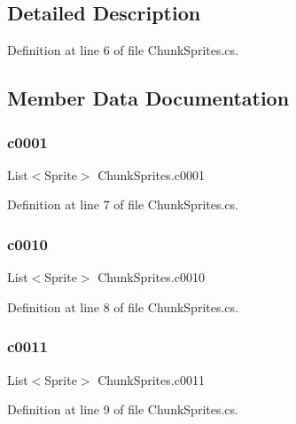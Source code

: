 \subsection{Detailed Description}


Definition at line 6 of file Chunk\+Sprites.\+cs.



\subsection{Member Data Documentation}
\mbox{\label{class_chunk_sprites_a36cf2ce2f744ce381fb5c76df8c4fc50}} 
\subsubsection{\texorpdfstring{c0001}{c0001}}
{\footnotesize\ttfamily List$<$Sprite$>$ Chunk\+Sprites.\+c0001}



Definition at line 7 of file Chunk\+Sprites.\+cs.

\mbox{\label{class_chunk_sprites_a8ba71bfadb5b574f85b165ac1664fdd9}} 
\subsubsection{\texorpdfstring{c0010}{c0010}}
{\footnotesize\ttfamily List$<$Sprite$>$ Chunk\+Sprites.\+c0010}



Definition at line 8 of file Chunk\+Sprites.\+cs.

\mbox{\label{class_chunk_sprites_aabb06f4f31b60765a7ce3107505da123}} 
\subsubsection{\texorpdfstring{c0011}{c0011}}
{\footnotesize\ttfamily List$<$Sprite$>$ Chunk\+Sprites.\+c0011}



Definition at line 9 of file Chunk\+Sprites.\+cs.

